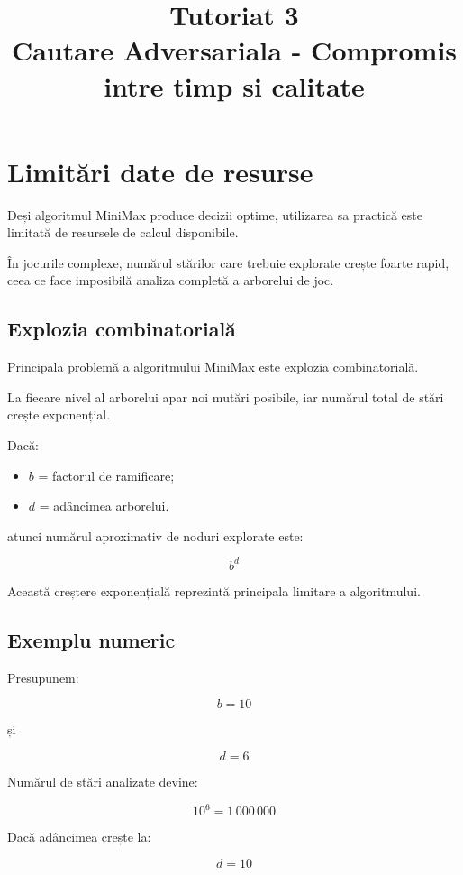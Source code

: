 \documentclass[12pt,a4paper]{article}
\title{Tutoriat 3\\Cautare Adversariala - Compromis intre timp si calitate}
\author{}
\date{}
\begin{document}
\maketitle

\section{Limitări date de resurse}

Deși algoritmul MiniMax produce decizii optime, utilizarea sa practică este limitată de resursele de calcul disponibile.

În jocurile complexe, numărul stărilor care trebuie explorate crește foarte rapid, ceea ce face imposibilă analiza completă a arborelui de joc.

\subsection{Explozia combinatorială}

Principala problemă a algoritmului MiniMax este explozia combinatorială.

La fiecare nivel al arborelui apar noi mutări posibile, iar numărul total de stări crește exponențial.

Dacă:

\begin{itemize} 
\item $b$ = factorul de ramificare; 
\item $d$ = adâncimea arborelui. 
\end{itemize}

atunci numărul aproximativ de noduri explorate este:

\[
b^d
\]

Această creștere exponențială reprezintă principala limitare a algoritmului.

\subsection{Exemplu numeric}

Presupunem:

\[
b = 10
\]

și

\[
d = 6
\]

Numărul de stări analizate devine:

\[
10^6 = 1\,000\,000
\]

Dacă adâncimea crește la:

\[
d = 10
\]
\end{document}

